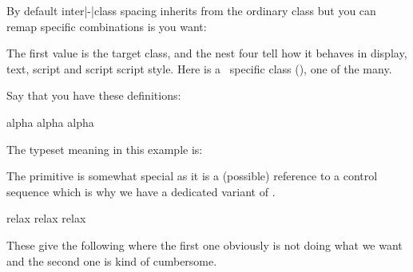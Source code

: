 \stopnewprimitive

\startnewprimitive[title={\prm {letmathspacing}}]

By default inter|-|class spacing inherits from the ordinary class but you can
remap specific combinations is you want:

\starttyping
{} \mathfunctioncode
    \mathordinarycode \mathordinarycode
    \mathordinarycode \mathordinarycode
\stoptyping

The first value is the target class, and the nest four tell how it behaves in
display, text, script and script script style. Here \typ {\mathfunctioncode} is a
\CONTEXT\ specific class (\the\mathfunctioncode), one of the many.

\stopnewprimitive

\startnewprimitive[title={\prm {letprotected}}]

Say that you have these definitions:

\startbuffer
             \def  \MyMacroA{alpha}
\protected   {}
             \edef \MyMacroC{\MyMacroA\MyMacroB}
      \MyMacroA
             \edef \MyMacroD{\MyMacroA\MyMacroB}
\meaning           \MyMacroC\crlf
\meaning           \MyMacroD\par
\stopbuffer

\typebuffer

The typeset meaning in this example is:

{\tttf \getbuffer}

\stopnewprimitive

\startnewprimitive[title={\prm {lettolastnamedcs}}]

The  primitive is somewhat special as it is a (possible)
reference to  a control sequence which is why we have a dedicated variant of
.

\startbuffer
\csname relax\endcsname\let                         \foo\lastnamedcs \meaning\foo
\csname relax\endcsname\expandafter\let\expandafter \oof\lastnamedcs \meaning\oof
\csname relax\endcsname{}            \ofo             \meaning\ofo
\stopbuffer

\typebuffer %

These give the following where the first one obviously is not doing what we want
and the second one is kind of cumbersome.

\startlines
\getbuffer
\stoplines

\stopnewprimitive

